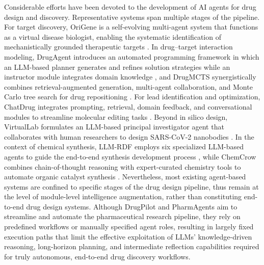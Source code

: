 \documentclass{article}
\begin{document}
Considerable efforts have been devoted to the development of AI agents for drug design and discovery. Representative systems span multiple stages of the pipeline. For target discovery, OriGene is a self-evolving multi-agent system that functions as a virtual disease biologist, enabling the systematic identification of mechanistically grounded therapeutic targets \cite{zhang2025origene}. In drug–target interaction modeling, DrugAgent introduces an automated programming framework in which an LLM-based planner generates and refines solution strategies while an instructor module integrates domain knowledge \cite{liu2024drugagent}, and DrugMCTS synergistically combines retrieval-augmented generation, multi-agent collaboration, and Monte Carlo tree search for drug repositioning \cite{yang2025drugmcts}. For lead identification and optimization, ChatDrug integrates prompting, retrieval, domain feedback, and conversational modules to streamline molecular editing tasks \cite{liu2024conversational}. Beyond in silico design, VirtualLab formulates an LLM-based principal investigator agent that collaborates with human researchers to design SARS-CoV-2 nanobodies \cite{swanson2025virtual}. In the context of chemical synthesis, LLM-RDF employs six specialized LLM-based agents to guide the end-to-end synthesis development process \cite{ruan2024automatic}, while ChemCrow combines chain-of-thought reasoning with expert-curated chemistry tools to automate organic catalyst synthesis \cite{m2024augmenting}. Nevertheless, most existing agent-based systems are confined to specific stages of the drug design pipeline, thus remain at the level of module-level intelligence augmentation, rather than constituting end-to-end drug design systems. Although DrugPilot \cite{li2025drugpilot} and PharmAgents \cite{gao2025pharmagents} aim to streamline and automate the pharmaceutical research pipeline, they rely on predefined workflows or manually specified agent roles, resulting in largely fixed execution paths that limit the effective exploitation of LLMs’ knowledge-driven reasoning, long-horizon planning, and intermediate reflection capabilities required for truly autonomous, end-to-end drug discovery workflows.
\end{document}
